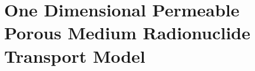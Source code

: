 \section{One Dimensional Permeable Porous Medium Radionuclide Transport 
Model}\label{sec:one_dim_ppm}
